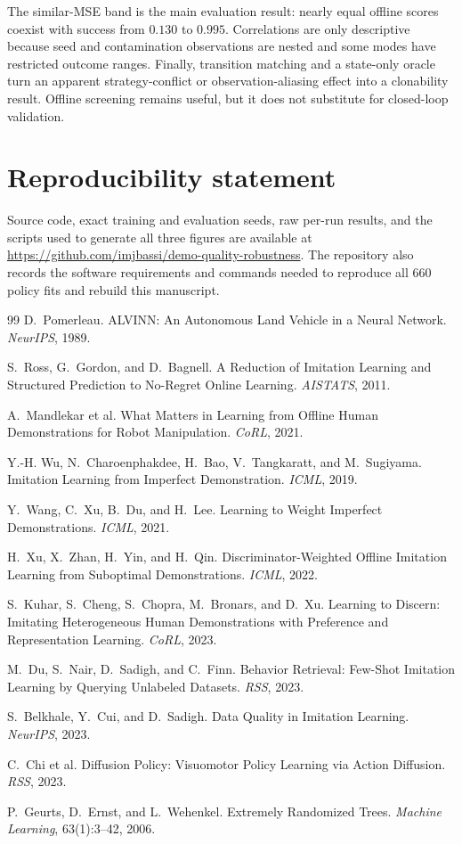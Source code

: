 \documentclass[10pt,twocolumn]{article}
\begin{document}
The similar-MSE band is the main evaluation result: nearly equal offline
scores coexist with success from $0.130$ to $0.995$. Correlations are only
descriptive because seed and contamination observations are nested and some
modes have restricted outcome ranges. Finally, transition matching and a
state-only oracle turn an apparent strategy-conflict or observation-aliasing
effect into a clonability result. Offline screening remains useful, but it
does not substitute for closed-loop validation.

\section*{Reproducibility statement}

Source code, exact training and evaluation seeds, raw per-run results, and the
scripts used to generate all three figures are available at
\url{https://github.com/imjbassi/demo-quality-robustness}. The repository also
records the software requirements and commands needed to reproduce all 660
policy fits and rebuild this manuscript.

\begin{thebibliography}{99}
\small
\setlength{\itemsep}{0pt}
D.~Pomerleau. ALVINN: An Autonomous Land Vehicle in a Neural Network.
\textit{NeurIPS}, 1989.

S.~Ross, G.~Gordon, and D.~Bagnell. A Reduction of Imitation Learning and
Structured Prediction to No-Regret Online Learning. \textit{AISTATS}, 2011.

A.~Mandlekar et al. What Matters in Learning from Offline Human
Demonstrations for Robot Manipulation. \textit{CoRL}, 2021.

Y.-H. Wu, N.~Charoenphakdee, H.~Bao, V.~Tangkaratt, and M.~Sugiyama.
Imitation Learning from Imperfect Demonstration. \textit{ICML}, 2019.

Y.~Wang, C.~Xu, B.~Du, and H.~Lee. Learning to Weight Imperfect
Demonstrations. \textit{ICML}, 2021.

H.~Xu, X.~Zhan, H.~Yin, and H.~Qin. Discriminator-Weighted Offline Imitation
Learning from Suboptimal Demonstrations. \textit{ICML}, 2022.

S.~Kuhar, S.~Cheng, S.~Chopra, M.~Bronars, and D.~Xu. Learning to Discern:
Imitating Heterogeneous Human Demonstrations with Preference and
Representation Learning. \textit{CoRL}, 2023.

M.~Du, S.~Nair, D.~Sadigh, and C.~Finn. Behavior Retrieval: Few-Shot
Imitation Learning by Querying Unlabeled Datasets. \textit{RSS}, 2023.

S.~Belkhale, Y.~Cui, and D.~Sadigh. Data Quality in Imitation Learning.
\textit{NeurIPS}, 2023.

C.~Chi et al. Diffusion Policy: Visuomotor Policy Learning via Action
Diffusion. \textit{RSS}, 2023.

P.~Geurts, D.~Ernst, and L.~Wehenkel. Extremely Randomized Trees.
\textit{Machine Learning}, 63(1):3--42, 2006.
\end{thebibliography}
\end{document}
